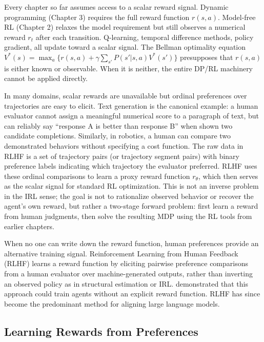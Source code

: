 Every chapter so far assumes access to a scalar reward signal. Dynamic programming (Chapter 3) requires the full reward function $r(s,a)$. Model-free RL (Chapter 2) relaxes the model requirement but still observes a numerical reward $r_t$ after each transition. Q-learning, temporal difference methods, policy gradient, all update toward a scalar signal. The Bellman optimality equation $V^*(s) = \max_a \{r(s,a) + \gamma \sum_{s'} P(s'|s,a) V^*(s')\}$ presupposes that $r(s,a)$ is either known or observable. When it is neither, the entire DP/RL machinery cannot be applied directly.

In many domains, scalar rewards are unavailable but ordinal preferences over trajectories are easy to elicit. Text generation is the canonical example: a human evaluator cannot assign a meaningful numerical score to a paragraph of text, but can reliably say ``response A is better than response B'' when shown two candidate completions. Similarly, in robotics, a human can compare two demonstrated behaviors without specifying a cost function. The raw data in RLHF is a set of trajectory pairs (or trajectory segment pairs) with binary preference labels indicating which trajectory the evaluator preferred. RLHF uses these ordinal comparisons to learn a proxy reward function $r_\theta$, which then serves as the scalar signal for standard RL optimization. This is not an inverse problem in the IRL sense; the goal is not to rationalize observed behavior or recover the agent's own reward, but rather a two-stage forward problem: first learn a reward from human judgments, then solve the resulting MDP using the RL tools from earlier chapters.

When no one can write down the reward function, human preferences provide an alternative training signal. Reinforcement Learning from Human Feedback (RLHF) learns a reward function by eliciting pairwise preference comparisons from a human evaluator over machine-generated outputs, rather than inverting an observed policy as in structural estimation or IRL. \citet{christiano:2017} demonstrated that this approach could train agents without an explicit reward function. RLHF has since become the predominant method for aligning large language models.

\subsection{Learning Rewards from Preferences}

